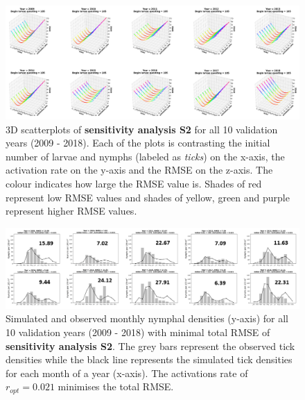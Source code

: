 \documentclass[a4paper, 11pt]{scrartcl}
\begin{document}
\begin{figure}
\centering
\includegraphics[width=\linewidth]{figures/initial_ticks_without_beech_error.png}
\caption{3D scatterplots of \textbf{sensitivity analysis S2} for all 10 validation years (2009 - 2018). Each of the plots is contrasting the initial number of larvae and nymphs
(labeled as \textit{ticks}) on the x-axis, the activation rate on the y-axis and the RMSE on the z-axis. The colour indicates how large the RMSE value is. Shades of red
represent low RMSE values and shades of yellow, green and purple represent higher RMSE values.}
\label{fig:initial_ticks_without_beech_error_rotated}
\end{figure}

\begin{figure}
\centering
\includegraphics[width=\linewidth]{figures/initial_ticks_without_beech.png}
\caption{Simulated and observed monthly nymphal densities (y-axis) for all 10 validation years (2009 - 2018) with minimal total RMSE of \textbf{sensitivity analysis S2}. The
grey bars represent the observed tick densities while the black line represents the simulated tick densities for each month of a year (x-axis). The activations rate of
$r_{opt}= 0.021$ minimises the total RMSE.}
\label{fig:initial_ticks_without_beech_rotated}
\end{figure}
\end{document}

